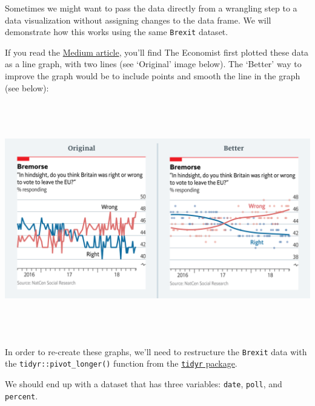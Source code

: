 \documentclass[letterpaper,12pt,twoside,]{pinp}
\begin{document}
Sometimes we might want to pass the data directly from a wrangling step
to a data visualization without assigning changes to the data frame. We
will demonstrate how this works using the same \texttt{Brexit} dataset.

If you read the
\href{https://medium.economist.com/mistakes-weve-drawn-a-few-8cdd8a42d368}{Medium
article}, you'll find The Economist first plotted these data as a line
graph, with two lines (see `Original' image below). The `Better' way to
improve the graph would be to include points and smooth the line in the
graph (see below):

\begin{center}\includegraphics[width=7in,height=4in]{../img/original-brexit} \end{center}

In order to re-create these graphs, we'll need to restructure the
\texttt{Brexit} data with the \texttt{tidyr::pivot\_longer()} function
from the
\href{https://tidyr.tidyverse.org/reference/pivot_longer.html}{\texttt{tidyr}
package}.

We should end up with a dataset that has three variables: \texttt{date},
\texttt{poll}, and \texttt{percent}.

\begin{Shaded}
\begin{Highlighting}[]
\SpecialCharTok{\%\textgreater{}\%} \NormalTok{(} \SpecialCharTok{{-}}
                         \NormalTok{, }
                         \NormalTok{)}
\end{Highlighting}
\end{Shaded}
\end{document}
